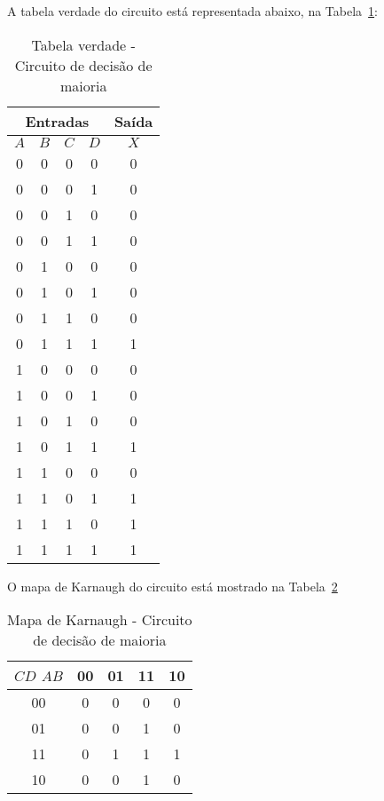 \documentclass[12pt]{article}
\begin{document}
A tabela verdade do circuito está representada abaixo, na Tabela~\ref{tab:circ_maioria}:

\begin{table}[H]
    \centering
    \caption{Tabela verdade - Circuito de decisão de maioria}

    \begin{tabular}{|c|c|c|c|c|}
    \hline
    \multicolumn{4}{c}{Entradas} & \multicolumn{1}{|c|}{Saída}\\
    \hline
    $A$ & $B$ & $C$ & $D$ & $X$\\
    \hline
    0 & 0 & 0 & 0 & 0\\
    \hline
    0 & 0 & 0 & 1 & 0\\
    \hline
    0 & 0 & 1 & 0 & 0\\
    \hline
    0 & 0 & 1 & 1 & 0\\
    \hline
    0 & 1 & 0 & 0 & 0\\
    \hline
    0 & 1 & 0 & 1 & 0\\
    \hline
    0 & 1 & 1 & 0 & 0\\
    \hline
    0 & 1 & 1 & 1 & 1\\
    \hline
    1 & 0 & 0 & 0 & 0\\
    \hline
    1 & 0 & 0 & 1 & 0\\
    \hline
    1 & 0 & 1 & 0 & 0\\
    \hline
    1 & 0 & 1 & 1 & 1\\
    \hline
    1 & 1 & 0 & 0 & 0\\
    \hline
    1 & 1 & 0 & 1 & 1\\
    \hline
    1 & 1 & 1 & 0 & 1\\
    \hline
    1 & 1 & 1 & 1 & 1\\
    \hline
    \end{tabular}
    \label{tab:circ_maioria}
\end{table}

O mapa de Karnaugh do circuito está mostrado na Tabela~\ref{tab:k_map_circ_maioria}

\begin{table}[H]
    \centering
    \caption{Mapa de Karnaugh - Circuito de decisão de maioria}

    \begin{tabular}{|c|c|c|c|c|}
    \hline
    $C$$D$ $A$$B$ & 00 & 01 & 11 & 10\\
    \hline
    00 & 0 & 0 & 0 & 0\\
    \hline
    01 & 0 & 0 & 1 & 0\\
    \hline
    11 & 0 & 1 & 1 & 1\\
    \hline
    10 & 0 & 0 & 1 & 0\\
    \hline
    \end{tabular}
    \label{tab:k_map_circ_maioria}
\end{table}
\end{document}

